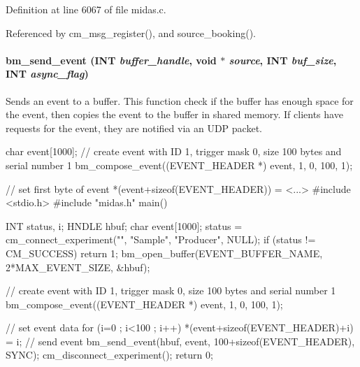 Definition at line 6067 of file midas.c.

Referenced by cm\_\-msg\_\-register(), and source\_\-booking().
\paragraph[{bm\_\-send\_\-event}]{ bm\_\-send\_\-event ({\bf INT} {\em buffer\_\-handle}, \/  void $\ast$ {\em source}, \/  {\bf INT} {\em buf\_\-size}, \/  {\bf INT} {\em async\_\-flag})}\hfill\label{group__bmfunctionc_ga499b14a246f8ab8d5a3b6ec77bfa9407}
Sends an event to a buffer. This function check if the buffer has enough space for the event, then copies the event to the buffer in shared memory. If clients have requests for the event, they are notified via an UDP packet. 
\begin{DoxyCode}
char event[1000];
// create event with ID 1, trigger mask 0, size 100 bytes and serial number 1
bm_compose_event((EVENT_HEADER *) event, 1, 0, 100, 1);

// set first byte of event
*(event+sizeof(EVENT_HEADER)) = <...>
#include <stdio.h>
#include "midas.h"
main()
{
 INT status, i;
 HNDLE hbuf;
 char event[1000];
 status = cm_connect_experiment("", "Sample", "Producer", NULL);
 if (status != CM_SUCCESS)
 return 1;
 bm_open_buffer(EVENT_BUFFER_NAME, 2*MAX_EVENT_SIZE, &hbuf);

 // create event with ID 1, trigger mask 0, size 100 bytes and serial number 1
 bm_compose_event((EVENT_HEADER *) event, 1, 0, 100, 1);

 // set event data
 for (i=0 ; i<100 ; i++)
 *(event+sizeof(EVENT_HEADER)+i) = i;
 // send event
 bm_send_event(hbuf, event, 100+sizeof(EVENT_HEADER), SYNC);
 cm_disconnect_experiment();
 return 0;
}
\end{DoxyCode}
 
